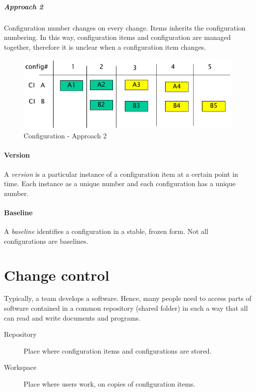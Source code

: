 \subparagraph{Approach 2}
Configuration number changes on every change. Items inherits the configuration numbering. In this way, configuration items and configuration are managed together, therefore it is unclear when a configuration item changes.

\begin{figure}[hbtp]
\centering
\includegraphics[scale=0.3]{images/configuration_approach2.png}
\caption{Configuration - Approach 2}
\end{figure}

\paragraph{Version}
A \emph{version} is a particular instance of a configuration item at a certain point in time. Each instance as a unique number and each configuration has a unique number.

\paragraph{Baseline}
A \emph{baseline} identifies a configuration in a stable, frozen form. Not all configurations are baselines.

\section{Change control}
Typically, a team develops a software. Hence, many people need to access parts of software contained in a common repository (shared folder) in such a way that all can read and write documents and programs.

\begin{description}
\item [Repository] Place where configuration items and configurations are stored.
\item [Workspace] Place where users work, on copies of configuration items.
\end{description}

